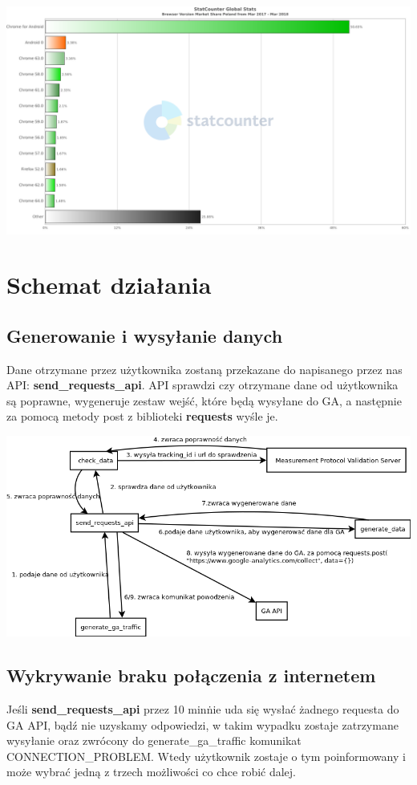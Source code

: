 \documentclass{article}
\begin{document}
\begin{itemize}
\begin{center}\includegraphics[scale=0.3]{chart}\end{center}
\end{itemize}

\section{Schemat działania}

\subsection{Generowanie i wysyłanie danych}
Dane otrzymane przez użytkownika zostaną przekazane do napisanego przez nas API: \textbf{send\_requests\_api}. API sprawdzi czy otrzymane dane od użytkownika są poprawne, wygeneruje zestaw wejść, które będą wysyłane do GA, a następnie za pomocą metody post z biblioteki \textbf{requests} wyśle je. 

\begin{center}\includegraphics[scale=0.5]{connection_ga}\end{center}

\subsection{Wykrywanie braku połączenia z internetem}
Jeśli \textbf{send\_requests\_api} przez 10 min\. nie uda się wysłać żadnego requesta do GA API, bądź nie uzyskamy odpowiedzi, w takim wypadku zostaje zatrzymane wysyłanie oraz zwrócony do generate\_ga\_traffic komunikat CONNECTION\_PROBLEM\@. Wtedy użytkownik zostaje o tym poinformowany i może wybrać jedną z trzech możliwości co chce robić dalej.
\end{document}
